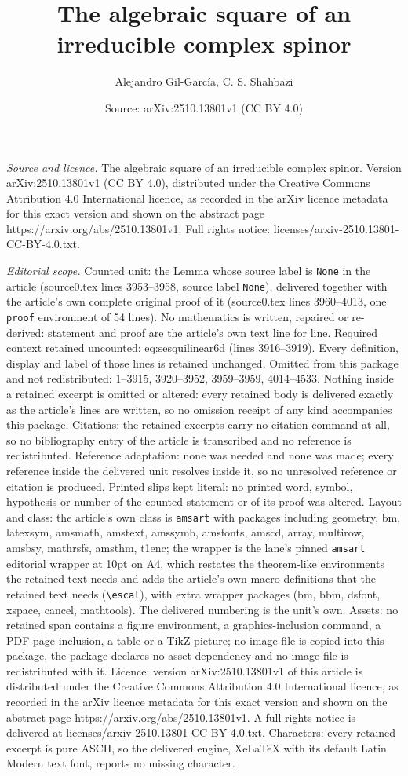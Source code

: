 \documentclass[10pt,a4paper]{amsart}
\title[The algebraic square of an irreducible complex spinor]{The algebraic square of an irreducible complex spinor}
\author{Alejandro Gil-Garc\'ia, C. S. Shahbazi}
\date{Source: arXiv:2510.13801v1 (CC BY 4.0)}
\begin{document}
\maketitle

\noindent\emph{Source and licence.} The algebraic square of an irreducible complex spinor. Version arXiv:2510.13801v1 (CC BY 4.0), distributed under the Creative Commons Attribution 4.0 International licence, as recorded in the arXiv licence metadata for this exact version and shown on the abstract page https://arxiv.org/abs/2510.13801v1. Full rights notice: licenses/arxiv-2510.13801-CC-BY-4.0.txt.\par\smallskip

\noindent\textit{Editorial scope.} Counted unit: the Lemma whose source label is \texttt{None} in the article (source0.tex lines 3953--3958, source label \texttt{None}), delivered together with the article's own complete original proof of it (source0.tex lines 3960--4013, one \texttt{proof} environment of 54 lines). No mathematics is written, repaired or re-derived: statement and proof are the article's own text line for line. Required context retained uncounted: eq:sesquilinear6d (lines 3916--3919). Every definition, display and label of those lines is retained unchanged. Omitted from this package and not redistributed: 1--3915, 3920--3952, 3959--3959, 4014--4533. Nothing inside a retained excerpt is omitted or altered: every retained body is delivered exactly as the article's lines are written, so no omission receipt of any kind accompanies this package. Citations: the retained excerpts carry no citation command at all, so no bibliography entry of the article is transcribed and no reference is redistributed. Reference adaptation: none was needed and none was made; every reference inside the delivered unit resolves inside it, so no unresolved reference or citation is produced. Printed slips kept literal: no printed word, symbol, hypothesis or number of the counted statement or of its proof was altered. Layout and class: the article's own class is \texttt{amsart} with packages including geometry, bm, latexsym, amsmath, amstext, amssymb, amsfonts, amscd, array, multirow, amsbsy, mathrsfs, amsthm, t1enc; the wrapper is the lane's pinned \texttt{amsart} editorial wrapper at 10pt on A4, which restates the theorem-like environments the retained text needs and adds the article's own macro definitions that the retained text needs (\texttt{\textbackslash escal}), with extra wrapper packages (bm, bbm, dsfont, xspace, cancel, mathtools). The delivered numbering is the unit's own. Assets: no retained span contains a figure environment, a graphics-inclusion command, a PDF-page inclusion, a table or a TikZ picture; no image file is copied into this package, the package declares no asset dependency and no image file is redistributed with it. Licence: version arXiv:2510.13801v1 of this article is distributed under the Creative Commons Attribution 4.0 International licence, as recorded in the arXiv licence metadata for this exact version and shown on the abstract page https://arxiv.org/abs/2510.13801v1. A full rights notice is delivered at licenses/arxiv-2510.13801-CC-BY-4.0.txt. Characters: every retained excerpt is pure ASCII, so the delivered engine, XeLaTeX with its default Latin Modern text font, reports no missing character.
\end{document}

